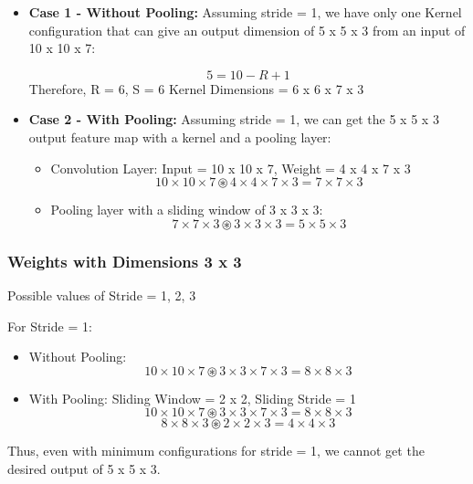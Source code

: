 \documentclass{article}
\begin{document}
\begin{itemize}
    \item \textbf{Case 1 - Without Pooling:} Assuming stride = 1, we have only one Kernel configuration that can give an output dimension of 5 x 5 x 3 from an input of 10 x 10 x 7:

    \begin{equation*}
        5 = 10 - R + 1
    \end{equation*}
    Therefore, R = 6, S = 6 \newline
    Kernel Dimensions = 6 x 6 x 7 x 3
    \item \textbf{Case 2 - With Pooling:} Assuming stride = 1, we can get the 5 x 5 x 3 output feature map with a kernel and a pooling layer:
    \begin{itemize}
        \item Convolution Layer: Input = 10 x 10 x 7, Weight = 4 x 4 x 7 x 3
        \begin{equation}
            10 \times 10 \times 7 \circledast 4 \times 4 \times 7 \times 3 = 7 \times 7 \times 3
        \end{equation}
        \item Pooling layer with a sliding window of 3 x 3 x 3:
        \begin{equation}
            7 \times 7 \times 3 \circledast 3 \times 3 \times 3 = 5 \times 5 \times 3
        \end{equation}
    \end{itemize}
\end{itemize}

\subsubsection{Weights with Dimensions 3 x 3}
Possible values of Stride = 1, 2, 3

For Stride = 1:

\begin{itemize}
    \item Without Pooling: 
    \begin{equation}
    10 \times 10 \times 7 \circledast 3 \times 3 \times 7 \times 3 = 8 \times 8 \times 3    
    \end{equation}
    \item With Pooling: Sliding Window = 2 x 2, Sliding Stride = 1
    \begin{equation}
        10 \times 10 \times 7 \circledast 3 \times 3 \times 7 \times 3 = 8 \times 8 \times 3
    \end{equation}
    \begin{equation}
        8 \times 8 \times 3 \circledast 2 \times 2 \times 3 = 4 \times 4 \times 3
    \end{equation}
\end{itemize}
Thus, even with minimum configurations for stride = 1, we cannot get the desired output of 5 x 5 x 3.
\end{document}
